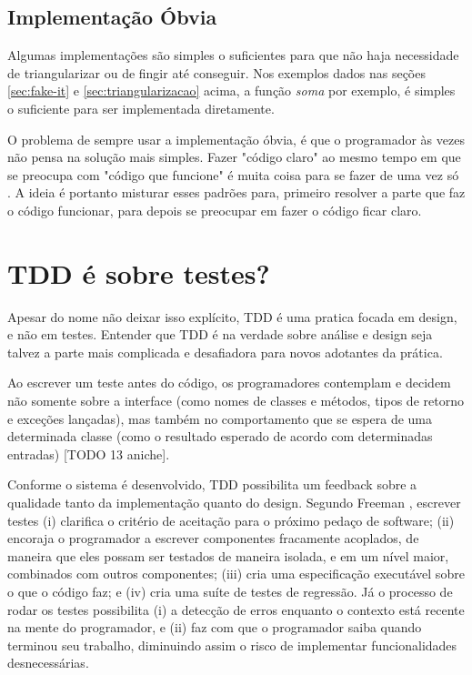 \subsection{Implementação Óbvia}

Algumas implementações são simples o suficientes para que não haja necessidade de triangularizar ou de fingir até conseguir. Nos exemplos
dados nas seções \ref{sec:fake-it} e \ref{sec:triangularizacao} acima, a função \textit{soma} por exemplo, é simples o suficiente para
ser implementada diretamente.

O problema de sempre usar a implementação óbvia, é que o programador às vezes não pensa na solução mais simples. Fazer "código claro" ao
mesmo tempo em que se preocupa com "código que funcione" é muita coisa para se fazer de uma vez só \cite{TDDByExample}. A ideia é portanto
misturar esses padrões para, primeiro resolver a parte que faz o código funcionar, para depois se preocupar em fazer o código ficar claro.

\section{TDD é sobre testes?}
\label{sec:tdd-e-design}

Apesar do nome não deixar isso explícito, TDD é uma pratica focada em design, e não em testes.
Entender que TDD é na verdade sobre análise e design seja talvez a parte mais complicada e desafiadora para novos adotantes da prática. 

Ao escrever um teste antes do código, os programadores contemplam e decidem não somente sobre a interface (como nomes de classes e 
métodos, tipos de retorno e exceções lançadas), mas também no comportamento que se espera de uma determinada classe 
(como o resultado esperado de acordo com determinadas entradas) [TODO 13 aniche].

Conforme o sistema é desenvolvido, TDD possibilita um feedback sobre a qualidade tanto da implementação quanto do design. Segundo 
Freeman \cite{GOOS}, escrever testes (i) clarifica o critério de aceitação para o próximo pedaço de software; (ii) encoraja o programador
a escrever componentes fracamente acoplados, de maneira que eles possam ser testados de maneira isolada, e em um nível maior, combinados
com outros componentes; (iii) cria uma especificação executável sobre o que o código faz; e (iv) cria uma suíte de testes de regressão.
Já o processo de rodar os testes possibilita (i) a detecção de erros enquanto o contexto está recente na mente do programador, e (ii)
faz com que o programador saiba quando terminou seu trabalho, diminuindo assim o risco de implementar funcionalidades desnecessárias.

